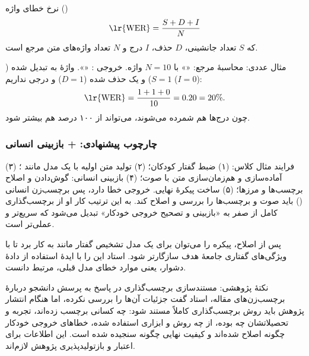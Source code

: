 
\begin{definitionbox}{نرخ خطای واژه ()}
\[
\text{\lr{WER}}=\frac{S+D+I}{N}
\]
که $S$ تعداد جانشینی، $D$ حذف، $I$ درج و $N$ تعداد واژه‌های متن مرجع است.
\end{definitionbox}

\begin{addedbox}{مثال عددی: محاسبهٔ }
مرجع: «» با $N=10$ واژه. خروجی : «». واژهٔ  به  تبدیل شده ($S=1$) و یک  حذف شده ($D=1$) و درجی نداریم ($I=0$):
\[
\text{\lr{WER}}=\frac{1+1+0}{10}=0.20=20\%.
\]
چون درج‌ها هم شمرده می‌شوند،  می‌تواند از ۱۰۰ درصد هم بیشتر شود.
\end{addedbox}

\subsubsection{چارچوب پیشنهادی:  + بازبینی انسانی}
فرایند مثال کلاس: (۱) ضبط گفتار کودکان؛ (۲) تولید متن اولیه با یک مدل  مانند ؛ (۳) آماده‌سازی  و هم‌زمان‌سازی متن با صوت؛ (۴) بازبینی انسانی: گوش‌دادن و اصلاح برچسب‌ها و مرزها؛ (۵) ساخت پیکرهٔ نهایی. خروجی  خطا دارد، پس برچسب‌زن انسانی () باید صوت و برچسب‌ها را بررسی و اصلاح کند. به این ترتیب کار او از برچسب‌گذاری کامل از صفر به «بازبینی و تصحیح خروجی خودکار» تبدیل می‌شود که سریع‌تر و عملی‌تر است.

پس از اصلاح، پیکره را می‌توان برای  یک مدل تشخیص گفتار مانند  به کار برد تا با ویژگی‌های گفتاری جامعهٔ هدف سازگارتر شود. استاد این را با ایدهٔ استفاده از دادهٔ دشوار، یعنی موارد خطای مدل قبلی، مرتبط دانست.

\begin{exambox}{نکتهٔ پژوهشی: مستندسازی برچسب‌گذاری}
در پاسخ به پرسش دانشجو دربارهٔ برچسب‌زن‌های مقاله، استاد گفت جزئیات آن‌ها را بررسی نکرده، اما هنگام انتشار پژوهش باید روش برچسب‌گذاری کاملاً مستند شود: چه کسانی برچسب زده‌اند، تجربه و تحصیلاتشان چه بوده، از چه روش و ابزاری استفاده شده، خطاهای خروجی خودکار چگونه اصلاح شده‌اند و کیفیت نهایی چگونه سنجیده شده است. این اطلاعات برای اعتبار و بازتولیدپذیری پژوهش لازم‌اند.
\end{exambox}

